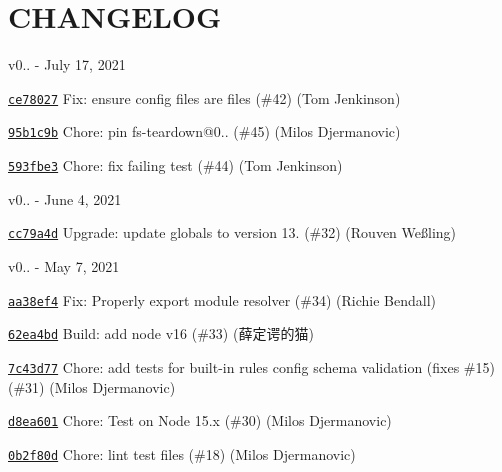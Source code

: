 \chapter{CHANGELOG}
\hypertarget{md__c_1_2_users_2_s_t_r_i_d_e_r_2source_2repos_2_ainslie_a_p_i_2wwwroot_2lib_2jquery-ui_2node__ma12ff99d1e79bf4ba38976330a953139}{}\label{md__c_1_2_users_2_s_t_r_i_d_e_r_2source_2repos_2_ainslie_a_p_i_2wwwroot_2lib_2jquery-ui_2node__ma12ff99d1e79bf4ba38976330a953139}
v0.. -\/ July 17, 2021


\begin{DoxyItemize}
\item \href{https://github.com/eslint/eslintrc/commit/ce78027f6a319a29fdf0b78ac1e7071373acffc4}{\texttt{ {\ttfamily ce78027}}} Fix\+: ensure config files are files (\#42) (Tom Jenkinson)
\item \href{https://github.com/eslint/eslintrc/commit/95b1c9b30267479a75cd07768f8f9e9cfa63c105}{\texttt{ {\ttfamily 95b1c9b}}} Chore\+: pin fs-\/teardown@0.. (\#45) (Milos Djermanovic)
\item \href{https://github.com/eslint/eslintrc/commit/593fbe3c2c1c5f723f71810963ed21a56caed4c1}{\texttt{ {\ttfamily 593fbe3}}} Chore\+: fix failing test (\#44) (Tom Jenkinson)
\end{DoxyItemize}

v0.. -\/ June 4, 2021


\begin{DoxyItemize}
\item \href{https://github.com/eslint/eslintrc/commit/cc79a4db45a2ca0236a846ed8eba28eea07d4db5}{\texttt{ {\ttfamily cc79a4d}}} Upgrade\+: update globals to version 13. (\#32) (Rouven Weßling)
\end{DoxyItemize}

v0.. -\/ May 7, 2021


\begin{DoxyItemize}
\item \href{https://github.com/eslint/eslintrc/commit/aa38ef40c3123f8f534c7f9b0b7c306f5f011dce}{\texttt{ {\ttfamily aa38ef4}}} Fix\+: Properly export module resolver (\#34) (Richie Bendall)
\item \href{https://github.com/eslint/eslintrc/commit/62ea4bd74b78fbeff12ffb21f1f978817601d4d1}{\texttt{ {\ttfamily 62ea4bd}}} Build\+: add node v16 (\#33) (薛定谔的猫)
\item \href{https://github.com/eslint/eslintrc/commit/7c43d7784e39cf0b7b102af64f703cade11252bb}{\texttt{ {\ttfamily 7c43d77}}} Chore\+: add tests for built-\/in rules config schema validation (fixes \#15) (\#31) (Milos Djermanovic)
\item \href{https://github.com/eslint/eslintrc/commit/d8ea601ecb4b9f81cdc332b012b6b1bbc984366c}{\texttt{ {\ttfamily d8ea601}}} Chore\+: Test on Node 15.\+x (\#30) (Milos Djermanovic)
\item \href{https://github.com/eslint/eslintrc/commit/0b2f80d6f6b33e4c5e168b08468867653f726754}{\texttt{ {\ttfamily 0b2f80d}}} Chore\+: lint test files (\#18) (Milos Djermanovic)
\end{DoxyItemize}

